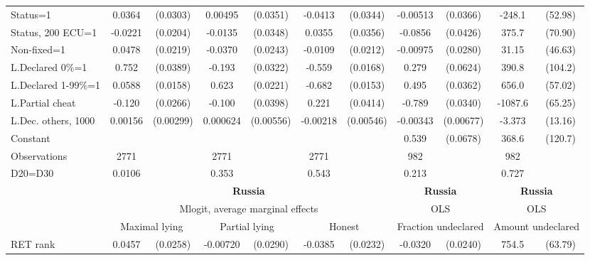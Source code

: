 \begin{tabular}{l|cccccc|cc|cc}
Status=1        &   0.0364         & (0.0303)&  0.00495         & (0.0351)&  -0.0413         & (0.0344)& -0.00513         & (0.0366)&   -248.1\sym{***}&  (52.98)\\
Status, 200 ECU=1&  -0.0221         & (0.0204)&  -0.0135         & (0.0348)&   0.0355         & (0.0356)&  -0.0856\sym{**} & (0.0426)&    375.7\sym{***}&  (70.90)\\
Non-fixed=1     &   0.0478\sym{**} & (0.0219)&  -0.0370         & (0.0243)&  -0.0109         & (0.0212)& -0.00975         & (0.0280)&    31.15         &  (46.63)\\
L.Declared 0\%=1&    0.752\sym{***}& (0.0389)&   -0.193\sym{***}& (0.0322)&   -0.559\sym{***}& (0.0168)&    0.279\sym{***}& (0.0624)&    390.8\sym{***}&  (104.2)\\
L.Declared 1-99\%=1&   0.0588\sym{***}& (0.0158)&    0.623\sym{***}& (0.0221)&   -0.682\sym{***}& (0.0153)&    0.495\sym{***}& (0.0362)&    656.0\sym{***}&  (57.02)\\
L.Partial cheat &   -0.120\sym{***}& (0.0266)&   -0.100\sym{**} & (0.0398)&    0.221\sym{***}& (0.0414)&   -0.789\sym{***}& (0.0340)&  -1087.6\sym{***}&  (65.25)\\
L.Dec. others, 1000&  0.00156         &(0.00299)& 0.000624         &(0.00556)& -0.00218         &(0.00546)& -0.00343         &(0.00677)&   -3.373         &  (13.16)\\
Constant        &                  &         &                  &         &                  &         &    0.539\sym{***}& (0.0678)&    368.6\sym{***}&  (120.7)\\
\hline
Observations    &     2771         &         &     2771         &         &     2771         &         &      982         &         &      982         &         \\
D20=D30         &   0.0106         &         &    0.353         &         &    0.543         &         &    0.213         &         &    0.727         &         \\
\hline\hline
&\multicolumn{6}{c|}{\bf Russia}&\multicolumn{2}{c|}{\bf Russia}&\multicolumn{2}{c}{\bf Russia}\\ &\multicolumn{6}{c|}{Mlogit, average marginal effects }&\multicolumn{2}{c|}{OLS}&\multicolumn{2}{c}{OLS}\\
                &\multicolumn{2}{c}{Maximal lying}&\multicolumn{2}{c}{Partial lying}&\multicolumn{2}{c}{Honest}  &\multicolumn{2}{c}{Fraction undeclared}&\multicolumn{2}{c}{Amount undeclared}\\
\hline
RET rank        &   0.0457\sym{*}  & (0.0258)& -0.00720         & (0.0290)&  -0.0385\sym{*}  & (0.0232)&  -0.0320         & (0.0240)&    754.5\sym{***}&  (63.79)\\

\end{tabular}

